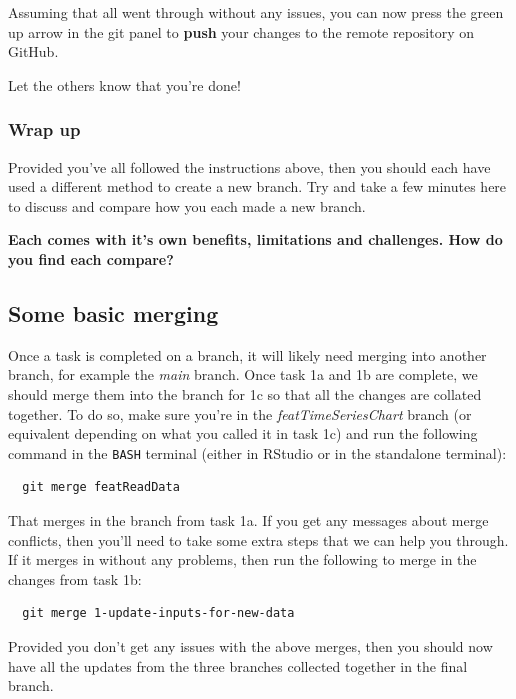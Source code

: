 \documentclass[
  12pt,
]{article}
\begin{document}
Assuming that all went through without any issues, you can now press the
green up arrow in the git panel to \textbf{push} your changes to the
remote repository on GitHub.

Let the others know that you're done!

\hypertarget{wrap-up}{%
\subsubsection{Wrap up}\label{wrap-up}}

Provided you've all followed the instructions above, then you should
each have used a different method to create a new branch. Try and take a
few minutes here to discuss and compare how you each made a new branch.

\textbf{Each comes with it's own benefits, limitations and challenges.
How do you find each compare?}

\hypertarget{some-basic-merging}{%
\subsection{Some basic merging}\label{some-basic-merging}}

Once a task is completed on a branch, it will likely need merging into
another branch, for example the \emph{main} branch. Once task 1a and 1b
are complete, we should merge them into the branch for 1c so that all
the changes are collated together. To do so, make sure you're in the
\emph{featTimeSeriesChart} branch (or equivalent depending on what you
called it in task 1c) and run the following command in the \texttt{BASH}
terminal (either in RStudio or in the standalone terminal):

\begin{verbatim}
  git merge featReadData
\end{verbatim}

That merges in the branch from task 1a. If you get any messages about
merge conflicts, then you'll need to take some extra steps that we can
help you through. If it merges in without any problems, then run the
following to merge in the changes from task 1b:

\begin{verbatim}
  git merge 1-update-inputs-for-new-data
\end{verbatim}

Provided you don't get any issues with the above merges, then you should
now have all the updates from the three branches collected together in
the final branch.
\end{document}
